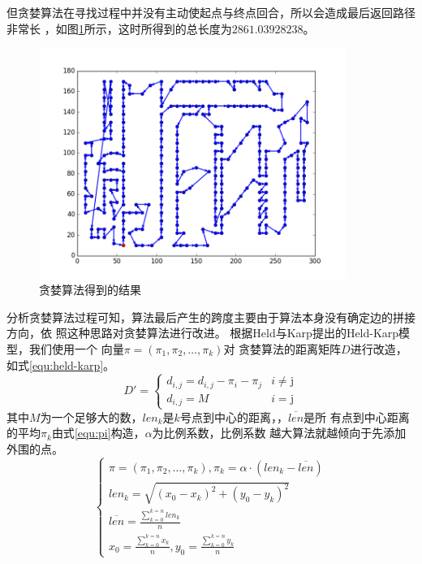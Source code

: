 \documentclass[fontset=windows,a4paper,12pt]{ctexart}
\begin{document}
         但贪婪算法在寻找过程中并没有主动使起点与终点回合，所以会造成最后返回路径非常长
         ，如图\ref{fig:fail}所示，这时所得到的总长度为$2861.03928238$。
         \begin{figure}[htbp]
            \centering
            \includegraphics[width=10cm]{pic/greedy_fail.png}
            \caption{贪婪算法得到的结果}
            \label{fig:fail}
        \end{figure}
        分析贪婪算法过程可知，算法最后产生的跨度主要由于算法本身没有确定边的拼接方向，依
        照这种思路对贪婪算法进行改进。
        根据Held与Karp提出的Held-Karp模型\cite{held1970traveling}，我们使用一个
        向量$\pi=(\pi_1,\pi_2,\dots,\pi_k)$对
        贪婪算法的距离矩阵$D$进行改造，如式\ref{equ:held-karp}。
        \begin{equation}
	        D'=\left\{
		        \begin{array}{ll}
		        	d_{i,j} = d_{i,j} - \pi_i - \pi_j & \textrm{$i \neq $j}\\
		        	d_{i,j} = M & \textrm{$i=$j}
		        \end{array}
	        \right.
	        \label{equ:held-karp}
        \end{equation}
        其中$M$为一个足够大的数，$len_k$是$k$号点到中心的距离，，$\overline{len}$是所
        有点到中心距离的平均$\pi_k$由式\ref{equ:pi}构造，$\alpha$为比例系数，比例系数
        越大算法就越倾向于先添加外围的点。
        \begin{equation}
             \left\{
	             \begin{array}{l}
		             \pi=(\pi_1,\pi_2,\dots{,\pi_k}),\pi_k=\alpha\cdot(len_k-\overline{len})\\
		             len_k = \sqrt{(x_0-x_k)^2+(y_0-y_k)^2}\\
		             \overline{len} = \frac{\sum_{k=0}^{k=n}len_k}{n}\\
		             x_0 = \frac{\sum_{k=0}^{k=n}x_k}{n},y_0 = \frac{\sum_{k=0}^{k=n}y_k}{n}
	             \end{array}
             \right.
             \label{equ:pi}
        \end{equation}
\end{document}
